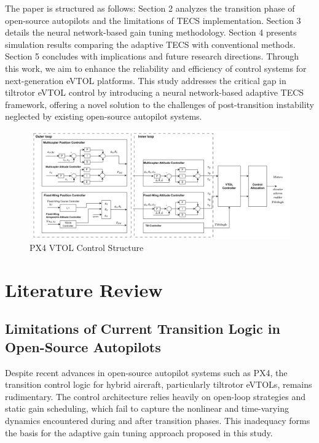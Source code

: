 \documentclass[journal,article,submit,pdftex,moreauthors]{Definitions/mdpi}
\begin{document}
The paper is structured as follows: Section 2 analyzes the transition phase of open-source autopilots and the limitations of TECS implementation. Section 3 details the neural network-based gain tuning methodology. Section 4 presents simulation results comparing the adaptive TECS with conventional methods. Section 5 concludes with implications and future research directions. Through this work, we aim to enhance the reliability and efficiency of control systems for next-generation eVTOL platforms.
This study addresses the critical gap in tiltrotor eVTOL control by introducing a neural network-based adaptive TECS framework, offering a novel solution to the challenges of post-transition instability neglected by existing open-source autopilot systems.
\begin{figure}[H]
    \centering
    \includegraphics[width=1\linewidth]{figures/PX4_VTOL_Control_Structure.png}
    \caption{PX4 VTOL Control Structure}
    \label{fig:enter-label}
\end{figure}
\section{Literature Review}
\subsection{Limitations of Current Transition Logic in Open-Source Autopilots}
Despite recent advances in open-source autopilot systems such as PX4, the transition control logic for hybrid aircraft, particularly tiltrotor eVTOLs, remains rudimentary. The control architecture relies heavily on open-loop strategies and static gain scheduling, which fail to capture the nonlinear and time-varying dynamics encountered during and after transition phases. This inadequacy forms the basis for the adaptive gain tuning approach proposed in this study.
\end{document}
